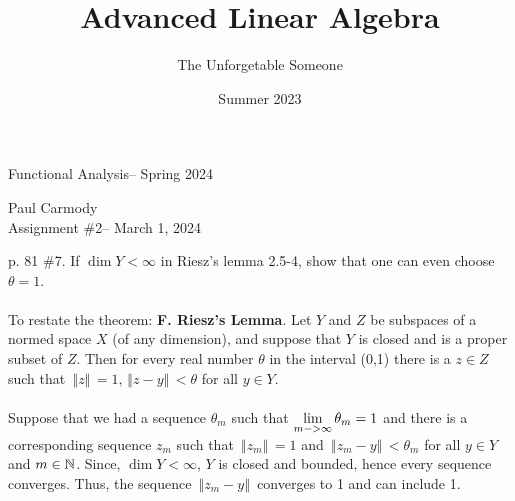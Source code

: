 \documentclass[10pt,a4paper]{report}
\title{Advanced Linear Algebra}
\author{The Unforgetable Someone}
\date{Summer 2023}
\newcommand{\CLASSNAME}{Functional Analysis}
\newcommand{\STUDENTNAME}{Paul Carmody}
\newcommand{\ASSIGNMENT}{Assignment \#2}
\newcommand{\DUEDATE}{March 1, 2024}
\newcommand{\SEMESTER}{Spring 2024}
\newcommand{\NORM}[1]{\,\left \Vert #1 \right \Vert\,}
\begin{document}
\begin{center}
	\Large{\CLASSNAME -- \SEMESTER} \\
\end{center}
\begin{center}
	\STUDENTNAME \\
	\ASSIGNMENT -- \DUEDATE\\
\end{center} 
\vskip 0.5cm
p. 81 \#7.  If $\dim Y < \infty$ in Riesz's lemma 2.5-4, show that one can even choose $\theta = 1$.\\
\\
To restate the theorem: \textbf{F. Riesz's Lemma}. Let $Y$ and $Z$ be subspaces of a normed space $X$ (of any dimension), and suppose that $Y$ is closed and is a proper
subset of $Z$. Then for every real number $\theta$ in the interval (0,1) there is a
$z \in Z$ such that $\NORM{z}= 1,\NORM{z - y} < \theta$ for all $y \in Y$.\\
\\
Suppose that we had a sequence $\theta_m$ such that $\underset{m->\infty}\lim\, \theta_m =1$ and there is a corresponding sequence $z_m$ such that $\NORM{z_m} = 1$ and $\NORM{z_m-y}<\theta_m$ for all $y \in Y$ and $m \in \mathbb{N}$.  Since, $\dim Y < \infty$, $Y$ is closed and bounded, hence every sequence converges.  Thus, the sequence $\NORM{z_m -y }$ converges to 1 and can include 1.
\end{document}
